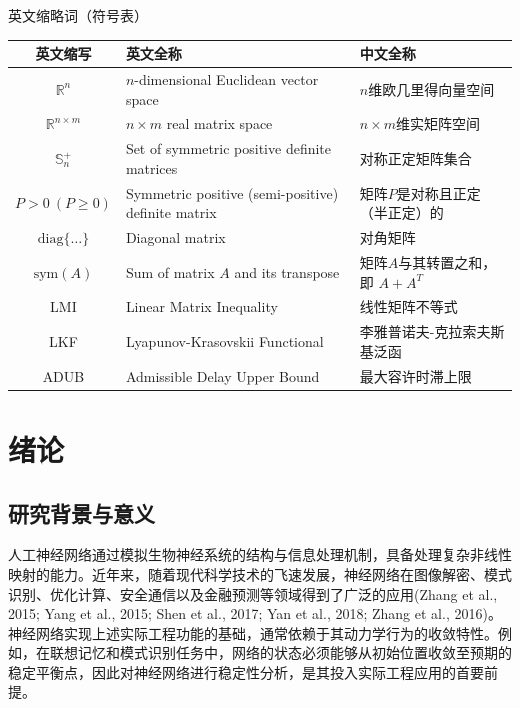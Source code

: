 \documentclass[a4paper, 12pt, oneside]{article}
\theoremstyle{cn_theorem}
\begin{document}

\clearpage
\centerline{\heiti 英文缩略词（符号表）}
\begin{center}
    \begin{tabularx}{\textwidth}{c >{\centering\arraybackslash}X >{\centering\arraybackslash}X}
        \toprule
        英文缩写 & 英文全称 & 中文全称 \\
        \midrule
        $\mathbb{R}^n$ & $n$-dimensional Euclidean vector space & $n$维欧几里得向量空间 \\
        $\mathbb{R}^{n \times m}$ & $n \times m$ real matrix space & $n \times m$维实矩阵空间 \\
        $\mathbb{S}_{n}^{+}$ & Set of symmetric positive definite matrices & 对称正定矩阵集合 \\
        $P > 0 \ (P \ge 0)$ & Symmetric positive (semi-positive) definite matrix & 矩阵$P$是对称且正定（半正定）的 \\
        $\mathrm{diag}\{\dots\}$ & Diagonal matrix & 对角矩阵 \\
        $\mathrm{sym}(A)$ & Sum of matrix $A$ and its transpose & 矩阵$A$与其转置之和，即 $A + A^T$ \\
        LMI & Linear Matrix Inequality & 线性矩阵不等式 \\
        LKF & Lyapunov-Krasovskii Functional & 李雅普诺夫-克拉索夫斯基泛函 \\
        ADUB & Admissible Delay Upper Bound & 最大容许时滞上限 \\
        \bottomrule
    \end{tabularx}
\end{center}

\clearpage
\tableofcontents 

\clearpage
{}
\setcounter{page}{1}

\section{绪论}

\subsection{研究背景与意义}
人工神经网络通过模拟生物神经系统的结构与信息处理机制，具备处理复杂非线性映射的能力。近年来，随着现代科学技术的飞速发展，神经网络在图像解密、模式识别、优化计算、安全通信以及金融预测等领域得到了广泛的应用(Zhang et al., 2015; Yang et al., 2015; Shen et al., 2017; Yan et al., 2018; Zhang et al., 2016)。神经网络实现上述实际工程功能的基础，通常依赖于其动力学行为的收敛特性。例如，在联想记忆和模式识别任务中，网络的状态必须能够从初始位置收敛至预期的稳定平衡点，因此对神经网络进行稳定性分析，是其投入实际工程应用的首要前提。
\end{document}
